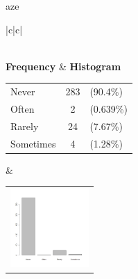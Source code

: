  aze 
  \begin{center}
    \addtolength{\leftskip}{-4cm}\addtolength{\rightskip}{-4cm}
    \begin{tabular}{|c|c|}

      \hline
        \\
      \hline
        {\bf Frequency} & {\bf Histogram}  \\
          \begin{tabular}{@{}l@{ : }cl@{}}
            Never & 283 &(90.4\%) \\
            Often & 2 &(0.639\%) \\
            Rarely & 24 &(7.67\%) \\
            Sometimes & 4 &(1.28\%) \\
          \end{tabular}
      &
          \begin{tabular}{@{}l@{}}
            \includegraphics[width=3cm]{graphUniv/V14-barplot}
          \end{tabular}
      \\ \hline 

    \end{tabular}
  \end{center}
  
  



